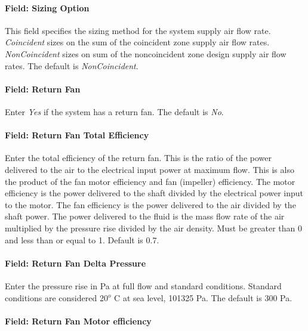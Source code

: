 \paragraph{Field: Sizing Option}\label{field-sizing-option-000}

This field specifies the sizing method for the system supply air flow rate. \emph{Coincident} sizes on the sum of the coincident zone supply air flow rates. \emph{NonCoincident} sizes on sum of the noncoincident zone design supply air flow rates. The default is \emph{NonCoincident}.

\paragraph{Field: Return Fan}\label{field-return-fan}

Enter \emph{Yes} if the system has a return fan. The default is \emph{No}.

\paragraph{Field: Return Fan Total Efficiency}\label{field-return-fan-total-efficiency}

Enter the total efficiency of the return fan. This is the ratio of the power delivered to the air to the electrical input power at maximum flow. This is also the product of the fan motor efficiency and fan (impeller) efficiency. The motor efficiency is the power delivered to the shaft divided by the electrical power input to the motor. The fan efficiency is the power delivered to the air divided by the shaft power. The power delivered to the fluid is the mass flow rate of the air multiplied by the pressure rise divided by the air density. Must be greater than 0 and less than or equal to 1. Default is 0.7.

\paragraph{Field: Return Fan Delta Pressure}\label{field-return-fan-delta-pressure-2}

Enter the pressure rise in Pa at full flow and standard conditions. Standard conditions are considered 20\(^{o}\) C at sea level, 101325 Pa. The default is 300 Pa.

\paragraph{Field: Return Fan Motor efficiency}\label{field-return-fan-motor-efficiency-2}

